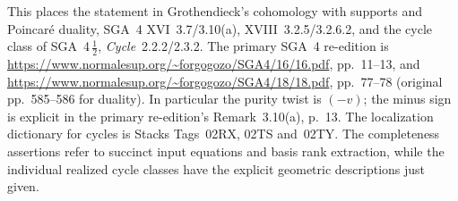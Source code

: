 This places the statement in Grothendieck's cohomology with supports and
Poincar\'e duality, SGA~4 XVI~3.7/3.10(a), XVIII~3.2.5/3.2.6.2, and
the cycle class of SGA~4\,$\frac12$, \emph{Cycle}~2.2.2/2.3.2.
The primary SGA~4 re-edition is
\url{https://www.normalesup.org/~forgogozo/SGA4/16/16.pdf}, pp.~11--13,
and \url{https://www.normalesup.org/~forgogozo/SGA4/18/18.pdf},
pp.~77--78 (original pp.~585--586 for duality).
In particular the purity twist is $(-v)$; the minus sign is explicit
in the primary re-edition's Remark~3.10(a), p.~13.
The localization dictionary for cycles is Stacks Tags~02RX, 02TS and~02TY.
The completeness assertions refer to succinct input equations and basis
rank extraction, while the individual realized cycle classes have the
explicit geometric descriptions just given.
